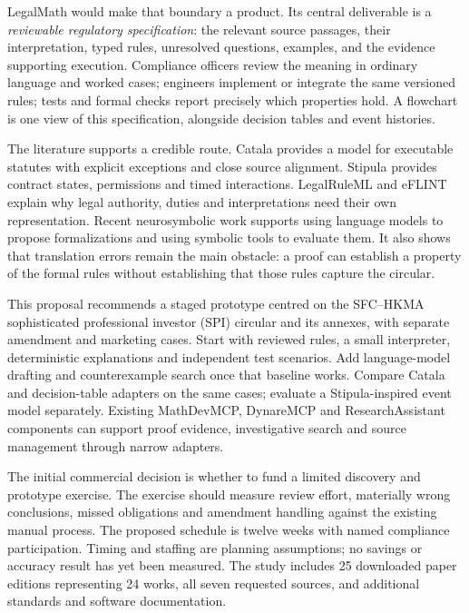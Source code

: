 \documentclass[11pt,a4paper]{article}
\begin{document}
LegalMath would make that boundary a product. Its central deliverable is a
\emph{reviewable regulatory specification}: the relevant source passages, their
interpretation, typed rules, unresolved questions, examples, and the evidence
supporting execution. Compliance officers review the meaning in ordinary language
and worked cases; engineers implement or integrate the same versioned rules; tests
and formal checks report precisely which properties hold. A flowchart is one view
of this specification, alongside decision tables and event histories.

The literature supports a credible route. Catala provides a model for executable
statutes with explicit exceptions and close source alignment. Stipula provides
contract states, permissions and timed interactions. LegalRuleML and eFLINT explain
why legal authority, duties and interpretations need their own representation.
Recent neurosymbolic work supports using language models to propose formalizations
and using symbolic tools to evaluate them. It also shows that translation errors
remain the main obstacle: a proof can establish a property of the formal rules
without establishing that those rules capture the circular.

This proposal recommends a staged prototype centred on the SFC--HKMA sophisticated
professional investor (SPI) circular and its annexes, with separate amendment and
marketing cases. Start with reviewed rules, a small interpreter, deterministic
explanations and independent test scenarios. Add language-model drafting and
counterexample search once that baseline works. Compare Catala and decision-table
adapters on the same cases; evaluate a Stipula-inspired event model separately.
Existing MathDevMCP, DynareMCP and ResearchAssistant components can support proof
evidence, investigative search and source management through narrow adapters.

The initial commercial decision is whether to fund a limited discovery and
prototype exercise.
The exercise should measure review effort, materially wrong conclusions, missed
obligations and amendment handling against the existing manual process. The
proposed schedule is twelve weeks with named compliance participation. Timing and
staffing are planning assumptions; no savings or accuracy result has yet been
measured. The study includes 25 downloaded paper editions representing 24 works,
all seven requested sources, and additional standards and software documentation.

\clearpage
\begingroup
\small
\setlength{\parskip}{0pt}
\tableofcontents
\endgroup
\clearpage





\clearpage
\begingroup
\raggedright


\endgroup
\end{document}
